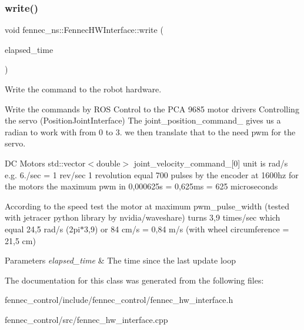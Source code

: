 \subsubsection{\texorpdfstring{write()}{write()}}
{\footnotesize\ttfamily void fennec\+\_\+ns\+::\+Fennec\+H\+W\+Interface\+::write (\begin{DoxyParamCaption}\item[{ros\+::\+Duration \&}]{elapsed\+\_\+time }\end{DoxyParamCaption})\hspace{0.3cm}{\ttfamily [virtual]}}



Write the command to the robot hardware. 

Write the commands by R\+OS Control to the P\+CA 9685 motor drivers Controlling the servo (Position\+Joint\+Interface) The joint\+\_\+position\+\_\+command\+\_\+ gives us a radian to work with from 0 to 3. we then translate that to the need pwm for the servo.

DC Motors std\+::vector$<$double$>$ joint\+\_\+velocity\+\_\+command\+\_\+\mbox{[}0\mbox{]} unit is rad/s e.\+g. 6./sec = 1 rev/sec 1 revolution equal 700 pulses by the encoder at 1600hz for the motors the maximum pwm in 0,000625s = 0,625ms = 625 microseconds

According to the speed test the motor at maximum pwm\+\_\+pulse\+\_\+width (tested with jetracer python library by nvidia/waveshare) turns 3,9 times/sec which equal 24,5 rad/s (2pi$\ast$3,9) or 84 cm/s = 0,84 m/s (with wheel circumference = 21,5 cm)


\begin{DoxyParams}{Parameters}
{\em elapsed\+\_\+time} & The time since the last update loop \\
\hline
\end{DoxyParams}


The documentation for this class was generated from the following files\+:\begin{DoxyCompactItemize}
\item 
fennec\+\_\+control/include/fennec\+\_\+control/fennec\+\_\+hw\+\_\+interface.\+h\item 
fennec\+\_\+control/src/fennec\+\_\+hw\+\_\+interface.\+cpp\end{DoxyCompactItemize}
